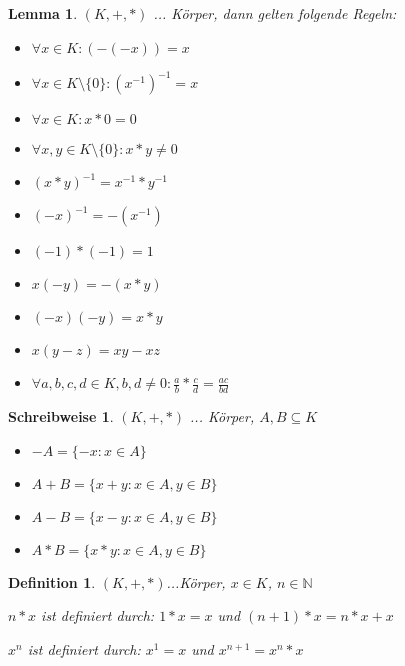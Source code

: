 \documentclass[twocolumn]{article}
\newtheorem{lemma}[theorem]{Lemma}
\newtheorem{definition}{Definition}[section]
\newtheorem*{schreibweise}{Schreibweise}
\begin{document}
\begin{lemma}
	$(K,+,*)$ ... Körper, dann gelten folgende Regeln:
	\begin{itemize}
		\item $\forall x \in K : (-(-x)) = x$
		\item $\forall x \in K \setminus \{0\} : (x^{-1})^{-1} = x$
		\item $\forall x \in K : x * 0 = 0$
		\item $\forall x,y \in K \setminus\{0\} : x * y \neq 0$
		\item $(x*y)^{-1} = x^{-1} * y^{-1}$
		\item $(-x)^{-1} = -(x^{-1})$
		\item $(-1)*(-1)=1$
		\item $x(-y)=-(x*y)$
		\item $(-x)(-y)=x*y$
		\item $x(y-z)=xy-xz$
		\item $\forall a,b,c,d \in K, b,d \neq 0 : \frac{a}{b}*\frac{c}{d}=\frac{ac}{bd}$
	\end{itemize}
\end{lemma}

\begin{schreibweise}
	$(K,+,*)$ ... Körper, $A,B\subseteq K$
	\begin{itemize}
		\item $-A = \{-x : x \in A\}$
		\item $A+B = \{x+y : x \in A, y \in B\}$
		\item $A-B = \{x-y : x \in A, y \in B\}$
		\item $A*B = \{x*y : x \in A, y \in B\}$
	\end{itemize}
\end{schreibweise}

\begin{definition}
	$(K,+,*)$...Körper, $x \in K$, $n \in \mathbb{N}$
	
	$n*x$ ist definiert durch: $1*x=x$ und $(n+1)*x=n*x+x$
	
	$x^{n}$ ist definiert durch: $x^{1}=x$ und $x^{n+1}=x^{n}*x$
\end{definition}
\end{document}
